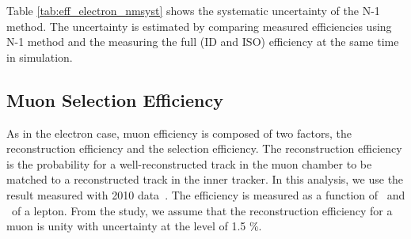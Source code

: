 Table \ref{tab:eff_electron_nmsyst} shows the systematic uncertainty of the N-1 method. 
The uncertainty is estimated by comparing measured efficiencies using N-1 method and 
the measuring the full (ID and ISO) efficiency at the same time in simulation. 

\subsection{Muon Selection Efficiency}

As in the electron case, muon efficiency is composed of two factors, 
the reconstruction efficiency and the selection efficiency. 
The reconstruction efficiency is the probability for a 
well-reconstructed track in the muon chamber to be matched to a reconstructed track 
in the inner tracker. In this analysis, we use the result measured with 2010 
data~\cite{Khachatryan:2010xn}.   
The efficiency is measured as a function 
of \pt~and \Eta~of a lepton. From the study, we assume that the reconstruction 
efficiency for a muon is unity with uncertainty at the level of 1.5 \%.

